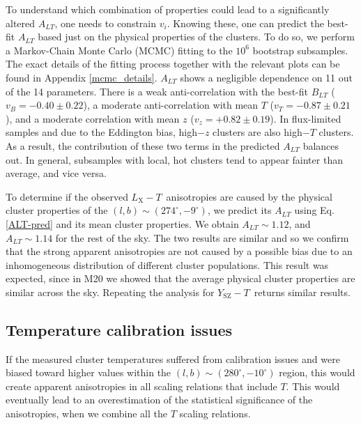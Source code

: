 \documentclass{aa}   %
\newcommand{\LT}{$L_{\text{X}}-T$}
\newcommand{\YT}{$Y_{\text{SZ}}-T$}
\begin{document}
To understand which combination of properties could lead to a significantly altered $A_{LT}$, one needs to constrain $v_i$. Knowing these, one can predict the best-fit $A_{LT}$ based just on the physical properties of the clusters. To do so, we perform a Markov-Chain Monte Carlo (MCMC) fitting to the $10^6$ bootstrap subsamples. The exact details of the fitting process together with the relevant plots can be found in Appendix \ref{mcmc_details}. $A_{LT}$ shows a negligible dependence on 11 out of the 14 parameters. There is a weak anti-correlation with the best-fit $B_{LT}$ ($v_B= -0.40\pm 0.22$), a moderate anti-correlation with mean $T$ ($v_T=-0.87\pm 0.21$), and a moderate correlation with mean $z$ ($v_z= +0.82\pm 0.19$). In flux-limited samples and due to the Eddington bias, high$-z$ clusters are also high$-T$ clusters. As a result, the contribution of these two terms in the predicted $A_{LT}$ balances out. In general, subsamples with local, hot clusters tend to appear fainter than average, and vice versa. 

To determine if the observed \LT\ anisotropies are caused by the physical cluster properties of the $(l,b)\sim (274^{\circ}, -9^{\circ})$, we predict its $A_{LT}$ using Eq. \ref{ALT-pred} and its mean cluster properties. We obtain $A_{LT}\sim 1.12$, and $A_{LT}\sim 1.14$ for the rest of the sky. The two results are similar and so we confirm that the strong apparent anisotropies are not caused by a possible bias due to an inhomogeneous distribution of different cluster populations. This result was expected, since in M20 we showed that the average physical cluster properties are similar across the sky. Repeating the analysis for \YT\ returns similar results.

\subsection{Temperature calibration issues}\label{temp-calib}

If the measured cluster temperatures suffered from calibration issues and were biased toward higher values within the $(l,b)\sim (280^{\circ}, -10^{\circ})$ region, this would create apparent anisotropies in all scaling relations that include $T$. This would eventually lead to an overestimation of the statistical significance of the anisotropies, when we combine all the $T$ scaling relations. 

\end{document}
